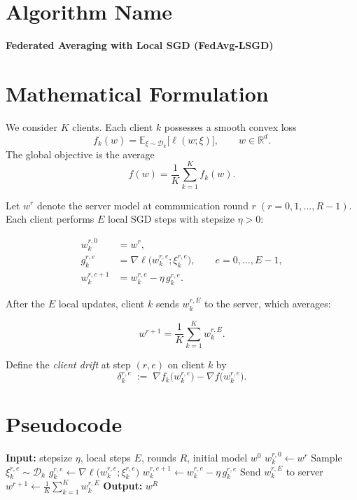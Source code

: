 \documentclass{article}
\newcommand{\E}{\mathbb{E}}
\newcommand{\R}{\mathbb{R}}
\begin{document}
\section*{Algorithm Name}
\textbf{Federated Averaging with Local SGD (FedAvg‑LSGD)}

\section*{Mathematical Formulation}
We consider $K$ clients.  Each client $k$ possesses a smooth convex loss 
\[
f_k(w)=\E_{\xi\sim\mathcal{D}_k}\bigl[\ell(w;\xi)\bigr],\qquad 
w\in\R^d .
\]
The global objective is the average
\[
f(w)=\frac1K\sum_{k=1}^{K}f_k(w).
\]

Let $w^{r}$ denote the server model at communication round $r\;(r=0,1,\dots,R-1)$.  
Each client performs $E$ local SGD steps with stepsize $\eta>0$:

\[
\begin{aligned}
w_{k}^{r,0}&=w^{r},\\
g_{k}^{r,e}&=\nabla \ell\!\bigl(w_{k}^{r,e};\xi_{k}^{r,e}\bigr),\qquad e=0,\dots,E-1,\\
w_{k}^{r,e+1}&=w_{k}^{r,e}-\eta\, g_{k}^{r,e}.
\end{aligned}
\]

After the $E$ local updates, client $k$ sends $w_{k}^{r,E}$ to the server, which averages:

\[
w^{r+1}= \frac1K\sum_{k=1}^{K} w_{k}^{r,E}.
\]

Define the \emph{client drift} at step $(r,e)$ on client $k$ by
\[
\delta_{k}^{r,e}\;:=\;\nabla f_k\!\bigl(w_{k}^{r,e}\bigr)-\nabla f\!\bigl(w_{k}^{r,e}\bigr).
\]

\section*{Pseudocode}
\begin{algorithm}[H]
\caption{FedAvg‑LSGD}
\begin{algorithmic}[1]
\State \textbf{Input:} stepsize $\eta$, local steps $E$, rounds $R$, initial model $w^{0}$
        \State $w_{k}^{r,0}\gets w^{r}$
            \State Sample $\xi_{k}^{r,e}\sim\mathcal{D}_k$
            \State $g_{k}^{r,e}\gets \nabla\ell\bigl(w_{k}^{r,e};\xi_{k}^{r,e}\bigr)$
            \State $w_{k}^{r,e+1}\gets w_{k}^{r,e}-\eta\, g_{k}^{r,e}$ 
        \EndFor
        \State Send $w_{k}^{r,E}$ to server
    \EndFor
    \State $w^{r+1}\gets \frac1K\sum_{k=1}^{K} w_{k}^{r,E}$ 
\EndFor
\State \textbf{Output:} $w^{R}$
\end{algorithmic}
\end{algorithm}
\end{document}
